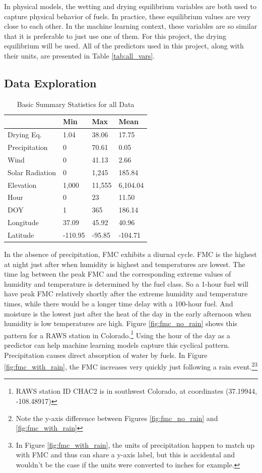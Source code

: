 \documentclass[11pt]{article}%
\begin{document}
In physical models, the wetting and drying equilibrium variables are both used to capture physical behavior of fuels. In practice, these equilibrium values are very close to each other. In the machine learning context, these variables are so similar that it is preferable to just use one of them. For this project, the drying equilibrium will be used. All of the predictors used in this project, along with their units, are presented in Table \ref{tab:all_vars}.

\subsection{Data Exploration}

\begin{table}[ht]
\centering
\caption{Basic Summary Statistics for all Data}
\label{tab:all_dat_summary}
\begin{tabular}{llll}
\toprule
 & Min & Max & Mean \\
\midrule
Drying Eq. & 1.04 & 38.06 & 17.75 \\
Precipitation & 0 & 70.61 & 0.05 \\
Wind & 0 & 41.13 & 2.66 \\
Solar Radiation & 0 & 1,245 & 185.84 \\
Elevation & 1,000 & 11,555 & 6,104.04 \\
Hour & 0 & 23 & 11.50 \\
DOY & 1 & 365 & 186.14 \\
Longitude & 37.09 & 45.92 & 40.96 \\
Latitude & -110.95 & -95.85 & -104.71 \\
\bottomrule
\end{tabular}
\end{table}

In the absence of precipitation, FMC exhibits a diurnal cycle. FMC is the highest at night just after when humidity is highest and temperatures are lowest. The time lag between the peak FMC and the corresponding extreme values of humidity and temperature is determined by the fuel class. So a 1-hour fuel will have peak FMC relatively shortly after the extreme humidity and temperature times, while there would be a longer time delay with a 100-hour fuel. And moisture is the lowest just after the heat of the day in the early afternoon when humidity is low temperatures are high. Figure \ref{fig:fmc_no_rain} shows this pattern for a RAWS station in Colorado.\footnote{RAWS station ID CHAC2 is in southwest Colorado, at coordinates (37.19944,	-108.48917)} Using the hour of the day as a predictor can help machine learning models capture this cyclical pattern. Precipitation causes direct absorption of water by fuels. In Figure \ref{fig:fmc_with_rain}, the FMC increases very quickly just following a rain event.\footnote{Note the y-axis difference between Figures \ref{fig:fmc_no_rain} and \ref{fig:fmc_with_rain}}\footnote{In Figure \ref{fig:fmc_with_rain}, the units of precipitation happen to match up with FMC and thus can share a y-axis label, but this is accidental and wouldn't be the case if the units were converted to inches for example.}
\end{document}
